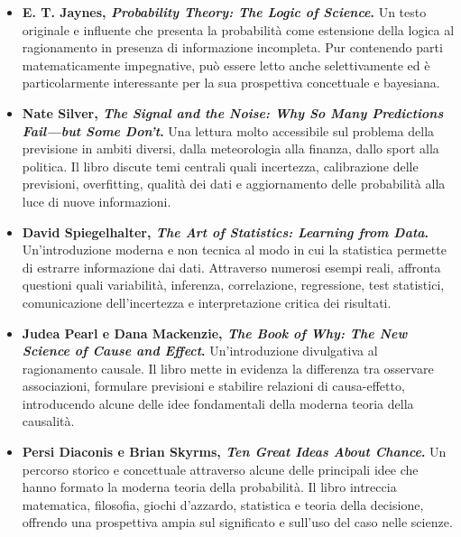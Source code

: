 \documentclass[
  italian,
  letterpaper,
]{book}
\theoremstyle{definition}
\theoremstyle{remark}
\begin{document}
\begin{itemize}
\item
  \textbf{E. T. Jaynes, \emph{Probability Theory: The Logic of
  Science}.} Un testo originale e influente che presenta la probabilità
  come estensione della logica al ragionamento in presenza di
  informazione incompleta. Pur contenendo parti matematicamente
  impegnative, può essere letto anche selettivamente ed è
  particolarmente interessante per la sua prospettiva concettuale e
  bayesiana.
\item
  \textbf{Nate Silver, \emph{The Signal and the Noise: Why So Many
  Predictions Fail---but Some Don't}.} Una lettura molto accessibile sul
  problema della previsione in ambiti diversi, dalla meteorologia alla
  finanza, dallo sport alla politica. Il libro discute temi centrali
  quali incertezza, calibrazione delle previsioni, overfitting, qualità
  dei dati e aggiornamento delle probabilità alla luce di nuove
  informazioni.
\item
  \textbf{David Spiegelhalter, \emph{The Art of Statistics: Learning
  from Data}.} Un'introduzione moderna e non tecnica al modo in cui la
  statistica permette di estrarre informazione dai dati. Attraverso
  numerosi esempi reali, affronta questioni quali variabilità,
  inferenza, correlazione, regressione, test statistici, comunicazione
  dell'incertezza e interpretazione critica dei risultati.
\item
  \textbf{Judea Pearl e Dana Mackenzie, \emph{The Book of Why: The New
  Science of Cause and Effect}.} Un'introduzione divulgativa al
  ragionamento causale. Il libro mette in evidenza la differenza tra
  osservare associazioni, formulare previsioni e stabilire relazioni di
  causa-effetto, introducendo alcune delle idee fondamentali della
  moderna teoria della causalità.
\item
  \textbf{Persi Diaconis e Brian Skyrms, \emph{Ten Great Ideas About
  Chance}.} Un percorso storico e concettuale attraverso alcune delle
  principali idee che hanno formato la moderna teoria della probabilità.
  Il libro intreccia matematica, filosofia, giochi d'azzardo, statistica
  e teoria della decisione, offrendo una prospettiva ampia sul
  significato e sull'uso del caso nelle scienze.
\end{itemize}


\backmatter
\end{document}
